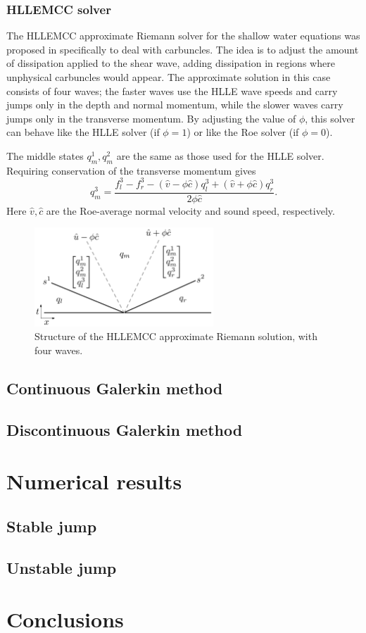 \documentclass{article}
\begin{document}
\subsubsection{HLLEMCC solver}
The HLLEMCC approximate Riemann solver for the shallow water equations was proposed
in \cite{kemm2014note} specifically to deal with carbuncles.  The idea is to adjust
the amount of dissipation applied to the shear wave, adding dissipation in regions
where unphysical carbuncles would appear.  The approximate solution in this
case consists of four waves; the faster waves use the HLLE wave speeds and carry
jumps only in the depth and normal momentum, while the slower waves carry jumps
only in the transverse momentum.  By adjusting the value of $\phi$, this solver
can behave like the HLLE solver (if $\phi=1$) or like the Roe solver (if $\phi=0$).

The middle states $q^1_m, q^2_m$ are the same as those used for the HLLE solver.
Requiring conservation of the transverse momentum gives
$$
    q^3_m = \frac{f^3_l - f^3_r - (\hat{v}-\phi\hat{c})q^3_l + (\hat{v}+\phi\hat{c})q^3_r}{2\phi\hat{c}}.
$$
Here $\hat{v}, \hat{c}$ are the Roe-average normal velocity and sound speed, respectively.

\begin{figure}
    \center
    \includegraphics[width=0.6\textwidth]{figures/hllemcc.pdf}
    \caption{Structure of the HLLEMCC approximate Riemann solution, with four waves.}
\end{figure}

\subsection{Continuous Galerkin method}

\subsection{Discontinuous Galerkin method}

\section{Numerical results}

\subsection{Stable jump}

\subsection{Unstable jump}

\section{Conclusions}




\end{document}
